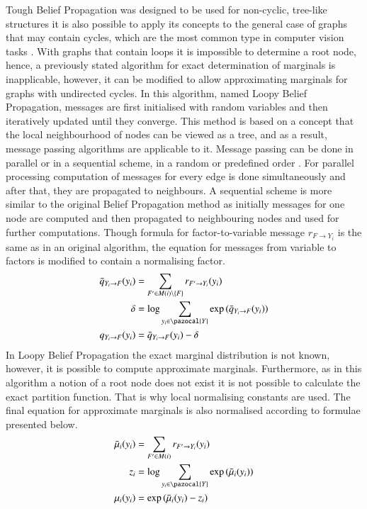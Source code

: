 Tough Belief Propagation was designed to be used for non-cyclic, tree-like structures it is also possible to apply its concepts to the general case of graphs that may contain cycles, which are the most common type in computer vision tasks \cite{lbp_byung}. With graphs that contain loops it is impossible to determine a root node, hence, a previously stated algorithm for exact determination of marginals is inapplicable, however, it can be modified to allow approximating marginals for graphs with undirected cycles. In this algorithm, named Loopy Belief Propagation, messages are first initialised with random variables and then iteratively updated until they converge. This method is based on a concept that the local neighbourhood of nodes can be viewed as a tree, and as a result, message passing algorithms are applicable to it. Message passing can be done in parallel or in a sequential scheme, in a random or predefined order \cite{MRFSurvey}. For parallel processing computation of messages for every edge is done simultaneously and after that, they are propagated to neighbours. A sequential scheme is more similar to the original Belief Propagation method as initially messages for one node are computed and then propagated to neighbouring nodes and used for further computations. Though formula for factor-to-variable message $r_{F\rightarrow Y_i}$ is the same as in an original algorithm, the equation for messages from variable to factors is modified to contain a normalising factor. 
\begin{align}
    \bar{q}_{Y_i\rightarrow F}(y_i) &= \sum_{F' \in M(i) \setminus \left \{ F \right \} }{ r_{F' \rightarrow Y_i}(y_i)} \\
    \delta &= \log{\sum_{y_i \in \pazocal{Y}}{\exp{( \bar{q}_{Y_i\rightarrow F}(y_i)})}} \\
    q_{Y_i\rightarrow F}(y_i) &= \bar{q}_{Y_i\rightarrow F}(y_i) - \delta
\end{align}
In Loopy Belief Propagation the exact marginal distribution is not known, however, it is possible to compute approximate marginals. Furthermore, as in this algorithm a notion of a root node does not exist it is not possible to calculate the exact partition function. That is why local normalising constants are used. The final equation for approximate marginals is also normalised according to formulae presented below.
\begin{align}
    \bar{\mu}_i (y_i) &= \sum_{F' \in M(i)}{r_{F'\rightarrow Y_i}(y_i)} \\
    z_i &= \log{\sum_{y_i \in \pazocal{Y}}{\exp{( \bar{\mu}_i (y_i))}}} \\
   \mu_i (y_i) &= \exp{(\bar{\mu}_i (y_i) - z_i)}
\end{align}

